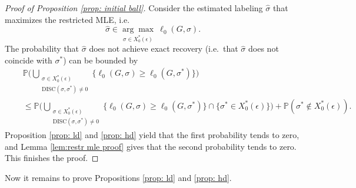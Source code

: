 \documentclass[11pt, a4paper]{amsart}
\newcommand{\1}{\mathbf{1}}
\theoremstyle{definition}
\theoremstyle{remark}
\theoremstyle{definition}
\begin{document}
\begin{proof}[Proof of Proposition \ref{prop: initial ball}] 
Consider the estimated labeling $\hat{\sigma}$ that maximizes the restricted MLE, i.e.
\begin{equation}
    \hat{\sigma} \in \underset{\sigma \in X^*_0(\epsilon)}{\arg \max } \ \ell_0(G,\sigma).
\end{equation}
The probability that $\hat \sigma$ does not achieve exact recovery (i.e.~that $\hat \sigma$ does not coincide with $\sigma ^*$) can be bounded by
\begin{equation}
\begin{split}
 &\mathbb{P}\Big( \bigcup_{\substack{\sigma\in X_0^*(\epsilon)\\ \text{DISC}(\sigma,\sigma^*) \neq 0}} \{\ell_0(G,\sigma) \ge \ell_0(G,\sigma^*)\} \Big)\\
 \quad &\le 
 \mathbb{P}\Big( \bigcup_{\substack{\sigma \in X_0^*(\epsilon)\\ \text{DISC}(\sigma,\sigma^*) \neq 0}} \{\ell_0(G,\sigma) \ge \ell_0(G,\sigma^*)\} \cap\{\sigma^* \in X_0^*(\epsilon)\} \Big) + \mathbb P(\sigma^* \notin X_0^*(\epsilon)). 
 \end{split}
\end{equation}
Proposition \ref{prop: ld} and \ref{prop: hd} yield that the first probability tends to zero, and Lemma \ref{lem:restr mle proof} gives that the second probability tends to zero. This finishes the proof.
\end{proof}
Now it remains to prove Propositions \ref{prop: ld} and \ref{prop: hd}.

\end{document}

